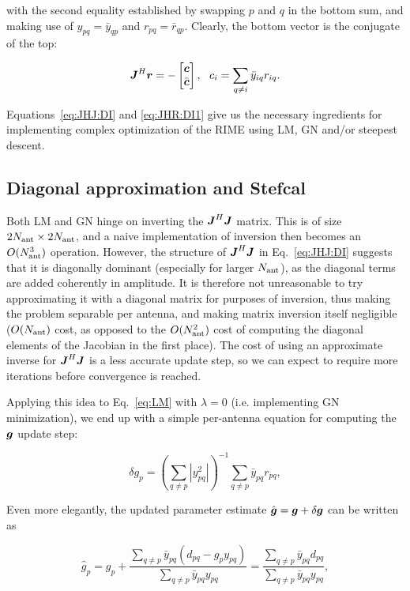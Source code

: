 \documentclass[useAMS,usenatbib]{mn2e}
\newcommand{\mat}[1]{{\bmath{#1}}}
\newcommand{\JJ}{\mat{J}} %
\newcommand{\JHJ}{\JJ^H\JJ} %
\begin{document}
with the second equality established by swapping $p$ and $q$ in the bottom sum, and making use of $y_{pq}=\bar{y}_{qp}$ and $r_{pq}=\bar{r}_{qp}$. Clearly, the bottom vector is the conjugate of the top:

\begin{equation}
\label{eq:JHR:DI1}
\JJ^H\bmath{r} = -\Matrix{c}{\bmath{c}\\\bar{\bmath{c}}},~~c_i = \sum\limits_{q\ne i} \bar{y}_{iq} r_{iq}.
\end{equation}

Equations~\ref{eq:JHJ:DI} and \ref{eq:JHR:DI1} give us the necessary ingredients for implementing complex
optimization of the RIME using LM, GN and/or steepest descent. 

\subsection{Diagonal approximation and Stefcal}
\label{sec:DI:stefcal}

Both LM and GN hinge on inverting the $\JJ^H\JJ$ matrix. This is of size $2N_\mathrm{ant}\times2N_\mathrm{ant}$, 
and a naive implementation of inversion then becomes 
an $O(N_\mathrm{ant}^3)$ operation. However, the structure of $\JJ^H\JJ$ in Eq.~\ref{eq:JHJ:DI} suggests that it is diagonally 
dominant (especially for larger $N_\mathrm{ant}$), as the diagonal terms are added coherently in amplitude. It is therefore not unreasonable 
to try approximating it with a diagonal matrix for purposes of inversion, thus making the problem separable per antenna,
and making matrix inversion itself negligible ($O(N_\mathrm{ant})$ cost, as opposed to the $O(N_\mathrm{ant}^2)$ cost of computing the 
diagonal elements of the Jacobian in the first place). The cost of using an approximate inverse for $\JHJ$ is a less accurate
update step, so we can expect to require more iterations before convergence is reached.

Applying this idea to Eq.~\ref{eq:LM} with $\lambda=0$ (i.e. implementing GN minimization), we end up with a 
simple per-antenna equation for computing the $\bmath{g}$ update step:

\begin{equation}
\label{eq:update:di:unpol}
\delta g_p = \left( \sum\limits_{q\ne p} |y^2_{pq}|  \right )^{-1} \sum\limits_{q\ne p} \bar{y}_{pq} r_{pq},
\end{equation}

Even more elegantly, the updated parameter estimate $\hat{\bmath{g}} = \bmath{g}+\delta \bmath{g}$ can be written as

\begin{equation}
\label{eq:stefcal}
\hat{g}_p = g_p + \frac{\sum\limits_{q\ne p} \bar{y}_{pq} (d_{pq} - g_p y_{pq})}{\sum\limits_{q\ne p} \bar{y}_{pq} y_{pq}} 
= \frac{\sum\limits_{q\ne p} \bar{y}_{pq} d_{pq} }{\sum\limits_{q\ne p} \bar{y}_{pq} y_{pq}},
\end{equation}
\end{document}
